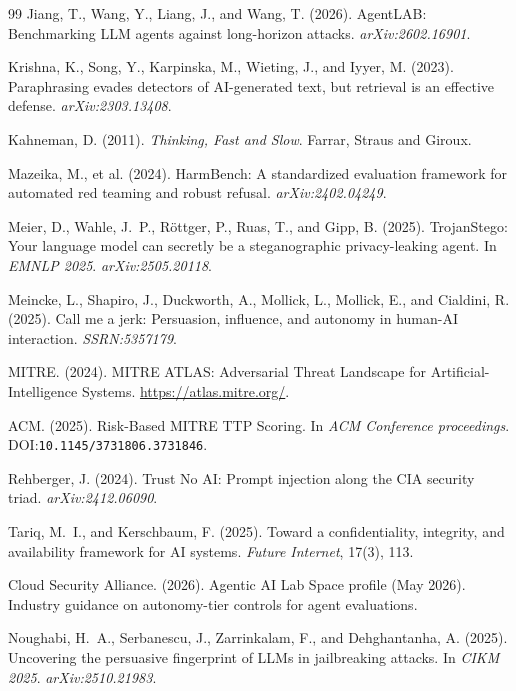 \documentclass[12pt]{article}
\begin{document}
\begin{thebibliography}{99}
Jiang, T., Wang, Y., Liang, J., and Wang, T. (2026).
AgentLAB: Benchmarking LLM agents against long-horizon attacks.
\textit{arXiv:2602.16901}.

Krishna, K., Song, Y., Karpinska, M., Wieting, J., and Iyyer, M. (2023).
Paraphrasing evades detectors of AI-generated text, but retrieval is an
effective defense.
\textit{arXiv:2303.13408}.

Kahneman, D. (2011).
\textit{Thinking, Fast and Slow}.
Farrar, Straus and Giroux.

Mazeika, M., et al. (2024).
HarmBench: A standardized evaluation framework for automated red teaming and
robust refusal.
\textit{arXiv:2402.04249}.

Meier, D., Wahle, J.~P., R\"ottger, P., Ruas, T., and Gipp, B. (2025).
TrojanStego: Your language model can secretly be a steganographic
privacy-leaking agent.
In \textit{EMNLP 2025}. \textit{arXiv:2505.20118}.

Meincke, L., Shapiro, J., Duckworth, A., Mollick, L., Mollick, E., and
Cialdini, R. (2025).
Call me a jerk: Persuasion, influence, and autonomy in human-AI interaction.
\textit{SSRN:5357179}.

MITRE. (2024).
MITRE ATLAS: Adversarial Threat Landscape for Artificial-Intelligence Systems.
\url{https://atlas.mitre.org/}.

ACM. (2025).
Risk-Based MITRE TTP Scoring.
In \textit{ACM Conference proceedings}.
DOI:\texttt{10.1145/3731806.3731846}.

Rehberger, J. (2024).
Trust No AI: Prompt injection along the CIA security triad.
\textit{arXiv:2412.06090}.

Tariq, M.~I., and Kerschbaum, F. (2025).
Toward a confidentiality, integrity, and availability framework for AI systems.
\textit{Future Internet}, 17(3), 113.

Cloud Security Alliance. (2026).
Agentic AI Lab Space profile (May 2026).
Industry guidance on autonomy-tier controls for agent evaluations.

Noughabi, H.~A., Serbanescu, J., Zarrinkalam, F., and Dehghantanha, A. (2025).
Uncovering the persuasive fingerprint of LLMs in jailbreaking attacks.
In \textit{CIKM 2025}. \textit{arXiv:2510.21983}.


\end{thebibliography}
\end{document}
